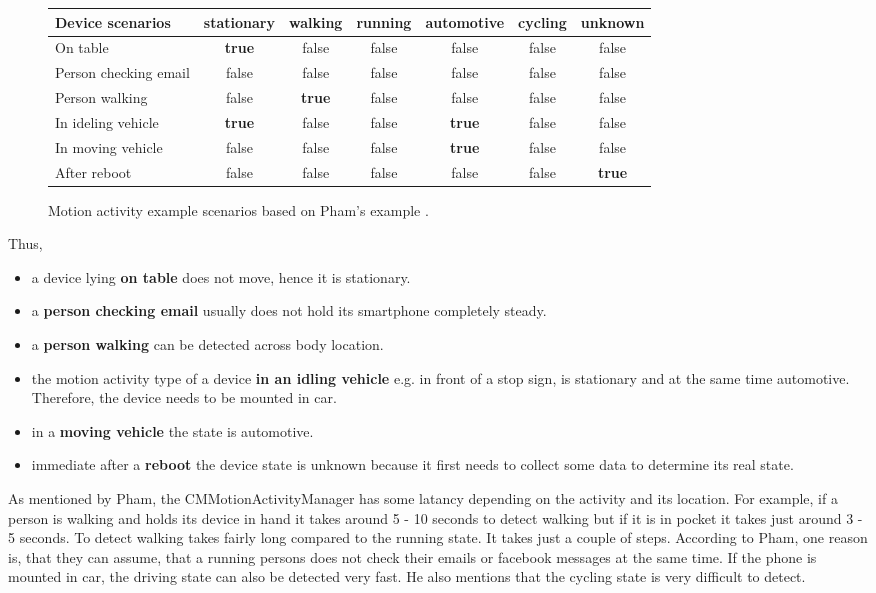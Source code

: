 \begin{center}
\begin{figure}
\begin{tabular}{l*{6}{c}}
Device scenarios & stationary & walking & running & automotive & cycling & unknown \\
\hline
On table & \textbf{true} & false & false & false & false & false\\
Person checking email & false & false & false & false & false & false\\
Person walking & false & \textbf{true} & false & false & false & false\\
In ideling vehicle & \textbf{true} & false & false & \textbf{true} & false & false\\
In moving vehicle & false & false & false & \textbf{true} & false & false\\
After reboot & false & false & false & false & false & \textbf{true}
\end{tabular}
\caption{Motion activity example scenarios based on Pham's example \cite{wwdc_2014}.}
\label{fig:motionActivity}
\end{figure}
\end{center}

Thus,
\begin{itemize}
  \item a device lying \textbf{on table} does not move, hence it is stationary.
  \item a \textbf{person checking email}  usually does not hold its smartphone completely steady.
  \item a \textbf{person walking} can be detected across body location.
  \item the motion activity type of a device \textbf{in an idling vehicle} e.g. in front of a stop sign, is stationary and at the same time automotive. Therefore, the device needs to be mounted in car.
  \item in a \textbf{moving vehicle} the state is  automotive.
  \item immediate after a \textbf{reboot} the device state is unknown because it first needs to collect some data to determine its real state.
\end{itemize}

As mentioned by Pham, the CMMotionActivityManager has some latancy depending on the activity and its location.
For example, if a person is walking and holds its device in hand it takes around 5 - 10 seconds to detect walking but if it is in pocket it takes just around 3 - 5 seconds.
To detect walking takes fairly long compared to the running state.
It takes just a couple of steps. According to Pham, one reason is, that they can assume, that a running persons does not check their emails or facebook messages at the same time.
If the phone is mounted in car, the driving state can also be detected very fast. He also mentions that the cycling state is very difficult to detect.

